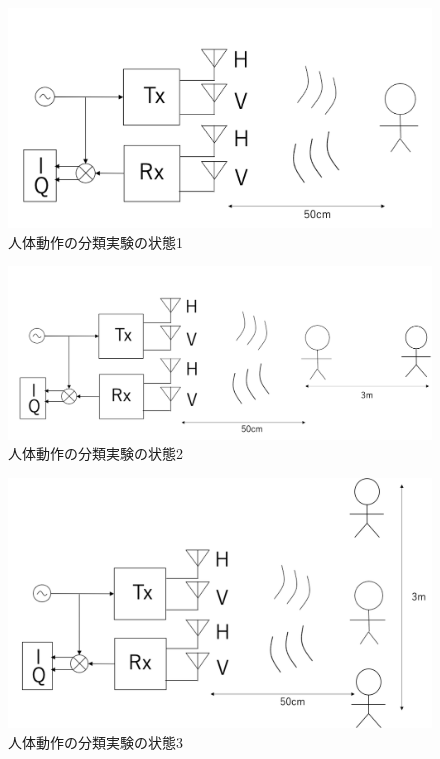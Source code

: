 \documentclass[uplatex,a4paper]{jsarticle}
\begin{document}
\begin{figure}[hbtp]
	\centering
	\includegraphics[scale=0.4]{../img/state1.png}
    \caption{人体動作の分類実験の状態1}
	\label{fig:state1}
\end{figure}
\begin{figure}[hbtp]
	\centering
	\includegraphics[scale=0.4]{../img/state2.png}
    \caption{人体動作の分類実験の状態2}
	\label{fig:state2}
\end{figure}
\begin{figure}[hbtp]
	\centering
	\includegraphics[scale=0.4]{../img/state3.png}
    \caption{人体動作の分類実験の状態3}
	\label{fig:state3}
\end{figure}
\end{document}
